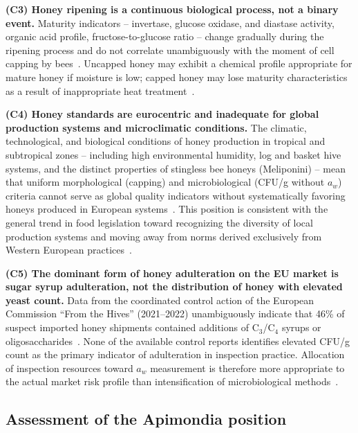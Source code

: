 \textbf{(C3) Honey ripening is a continuous biological process, not a binary event.}
Maturity indicators -- invertase, glucose oxidase, and diastase
activity, organic acid profile, fructose-to-glucose ratio --
change gradually during the ripening process and do not correlate
unambiguously with the moment of cell capping by
bees~\cite{zhang2021,sun2021}.
Uncapped honey may exhibit a chemical profile appropriate for
mature honey if moisture is low; capped honey may lose maturity
characteristics as a result of inappropriate heat
treatment~\cite{codex_stan12,guo2020,zhang2021}.

\textbf{(C4) Honey standards are eurocentric and inadequate for global production systems and microclimatic conditions.}
The climatic, technological, and biological conditions of honey
production in tropical and subtropical zones -- including high
environmental humidity, log and basket hive systems, and the
distinct properties of stingless bee honeys (Meliponini) -- mean
that uniform morphological (capping) and microbiological (CFU/g
without $a_w$) criteria cannot serve as global quality indicators
without systematically favoring honeys produced in European
systems~\cite{tadele2025,stinglessyeastbrazil2021,sciendo2012}.
This position is consistent with the general trend in food
legislation toward recognizing the diversity of local production
systems and moving away from norms derived exclusively from
Western European practices~\cite{phiri2022}.

\textbf{(C5) The dominant form of honey adulteration on the EU market is sugar syrup adulteration, not the distribution of honey with elevated yeast count.}
Data from the coordinated control action of the European Commission
``From the Hives'' (2021--2022) unambiguously indicate that 46\%
of suspect imported honey shipments contained additions of
C$_3$/C$_4$ syrups or oligosaccharides~\cite{eufromhives2021}.
None of the available control reports identifies elevated CFU/g
count as the primary indicator of adulteration in inspection
practice. Allocation of inspection resources toward $a_w$
measurement is therefore more appropriate to the actual market
risk profile than intensification of microbiological
methods~\cite{schoder2026,eufromhives2021}.

\subsection{Assessment of the Apimondia position}

